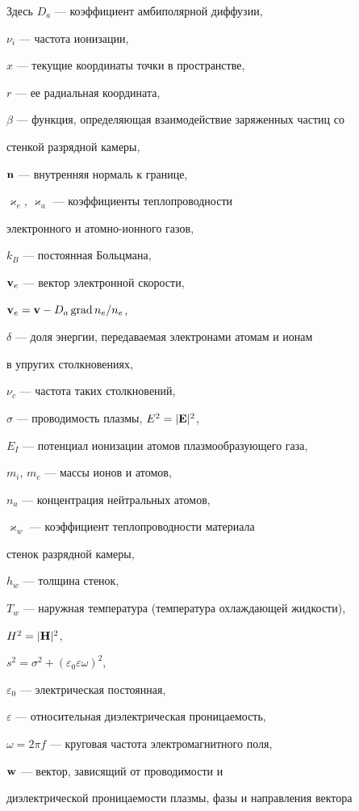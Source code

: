 Здесь $D_a$ --- коэффициент амбиполярной диффузии,


$\nu_i$ --- частота ионизации,


$x$ --- текущие координаты точки в пространстве,


$r$ --- ее радиальная координата,


$\beta$ --- функция, определяющая взаимодействие заряженных частиц со 


стенкой разрядной камеры,


$\bold{n}$ --- внутренняя нормаль к границе,


$\varkappa_{e}$, $\varkappa_{a}$ --- коэффициенты теплопроводности 


электронного и атомно-ионного газов,


$k_B$ --- постоянная Больцмана,


$\bold{v}_{e}$ --- вектор электронной скорости,


$ \bold v_e=\bold v - D_a \operatorname{grad} n_e / n_e$,


$\delta$ --- доля энергии, передаваемая электронами атомам и ионам


в упругих столкновениях,


$\nu_c$ --- частота таких столкновений,


$\sigma$ --- проводимость плазмы, $E^2=|\bold E|^2$,


$E_I$ --- потенциал ионизации атомов плазмообразующего газа,


$m_i$, $m_e$ --- массы ионов и атомов,


$n_a$ --- концентрация нейтральных атомов,


$\varkappa_{w}$ --- коэффициент теплопроводности материала


стенок разрядной камеры,


$h_w$ --- толщина стенок,


$T_w$ --- наружная температура (температура охлаждающей жидкости),


$H^2=|\bold H|^2$,


$s^2=\sigma^2+\left(\varepsilon_0 \varepsilon \omega\right)^2$,


$\varepsilon_0$ --- электрическая постоянная,


$\varepsilon$ --- относительная диэлектрическая проницаемость,


$\omega=2 \pi f$ --- круговая частота электромагнитного поля,


$\bold w$ --- вектор, зависящий от проводимости и


диэлектрической проницаемости плазмы, фазы и направления вектора


